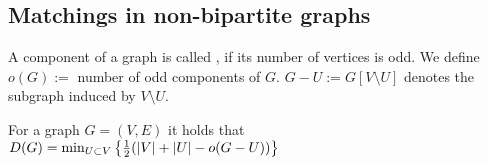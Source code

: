 \begin{lec}[2011-11-10]\end{lec}


\subsection*{Matchings in non-bipartite graphs}

\begin{defn}
	A component of a graph is called , if its number 
	of vertices is odd. We define $o(G):=$ number of odd components of $G$. 
	$G-U:=G[V \setminus U]$ denotes the subgraph induced by $V \setminus U$.
\end{defn}

\begin{thm}
	For a graph $G=(V,E)$ it holds that $D(G)=\min_{U \subset V} \left\{\frac{1}{2}(|V|+|U|-o(G-U))\right\}$
\end{thm}
	
